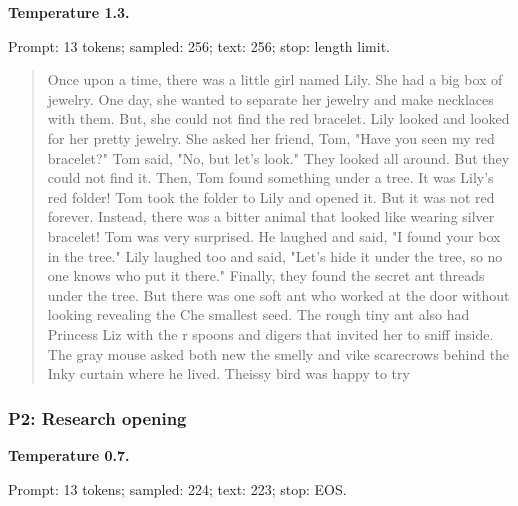 
\textbf{Temperature 1.3.}

{\footnotesize Prompt: 13 tokens; sampled: 256; text: 256; stop: length limit.}

\begin{quote}\small

Once upon a time, there was a little girl named Lily. She had a big box of jewelry. One day, she wanted to separate her jewelry and make necklaces with them. But, she could not find the red bracelet.
Lily looked and looked for her pretty jewelry. She asked her friend, Tom, "Have you seen my red bracelet?" Tom said, "No, but let's look." They looked all around. But they could not find it. Then, Tom found something under a tree. It was Lily's red folder!
Tom took the folder to Lily and opened it. But it was not red forever. Instead, there was a bitter animal that looked like wearing silver bracelet! Tom was very surprised. He laughed and said, "I found your box in the tree." Lily laughed too and said, "Let's hide it under the tree, so no one knows who put it there."
Finally, they found the secret ant threads under the tree. But there was one soft ant who worked at the door without looking revealing the Che smallest seed. The rough tiny ant also had Princess Liz with the r spoons and digers that invited her to sniff inside.
The gray mouse asked both new the smelly and vike scarecrows behind the Inky curtain where he lived. Theissy bird was happy to try

\end{quote}

\subsubsection{P2: Research opening}


\textbf{Temperature 0.7.}

{\footnotesize Prompt: 13 tokens; sampled: 224; text: 223; stop: EOS.}

